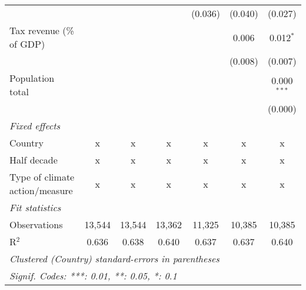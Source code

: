 \begin{tabular}{lcccccc}
                                                            &         &              &               & (0.036)      & (0.040)      & (0.027)\\   
   Tax revenue (\% of GDP)                                  &         &              &               &              & 0.006        & 0.012$^{*}$\\   
                                                            &         &              &               &              & (0.008)      & (0.007)\\   
   Population total                                         &         &              &               &              &              & 0.000$^{***}$\\   
                                                            &         &              &               &              &              & (0.000)\\   
   \emph{Fixed effects}\\
   Country                                                  & x       & x            & x             & x            & x            & x\\  
   Half decade                                              & x       & x            & x             & x            & x            & x\\  
   Type of climate action/measure                           & x       & x            & x             & x            & x            & x\\  
   \midrule \emph{Fit statistics}\\
   Observations                                             & 13,544  & 13,544       & 13,362        & 11,325       & 10,385       & 10,385\\  
   R$^2$                                                    & 0.636   & 0.638        & 0.640         & 0.637        & 0.637        & 0.640\\  
   \midrule
   \multicolumn{7}{l}{\emph{Clustered (Country) standard-errors in parentheses}}\\
   \multicolumn{7}{l}{\emph{Signif. Codes: ***: 0.01, **: 0.05, *: 0.1}}\\
\end{tabular}
\par\endgroup


